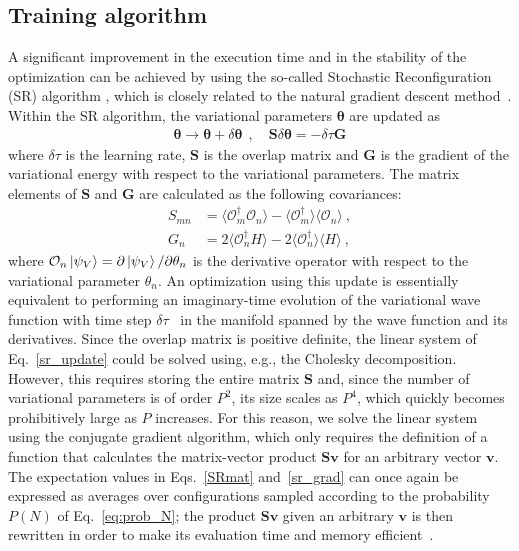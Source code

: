 \documentclass[aps,pre,floatfix,showpacs,twocolumn, preprintnumbers]{revtex4-1}
\begin{document}
\subsection{Training algorithm}\label{VMC:training}
A significant improvement in the execution time and in the stability of the optimization can be achieved by using the so-called Stochastic Reconfiguration (SR) algorithm \cite{Sorella:2005}, which is closely related to the natural gradient descent method~\cite{amari_natural_1998, Stokes:2019}. Within the SR algorithm, the variational parameters $\bm \theta$ are updated as
\begin{align}
\bm\theta\to\bm \theta+\delta \bm \theta \ \ ,\quad 
    \bm S\delta\bm \theta = -\delta\tau\bm G 
    \label{sr_update}
\end{align}
where $\delta\tau$ is the learning rate, $\bm S$ is the overlap matrix and $\bm G$ is the gradient of the variational energy with respect to the variational parameters. The matrix elements of $\bm S$ and $\bm G$ are calculated as the following covariances:
\begin{align}
    S_{mn} &= \langle \mathcal{O}_m^\dag\mathcal{O}_n\rangle - \langle \mathcal{O}_m^\dag\rangle\langle\mathcal{O}_n\rangle\ ,\label{SRmat}\\
    G_n &= 2\langle\mathcal{O}_n^\dag H\rangle - 2\langle \mathcal{O}_n^\dag\rangle\langle H\rangle\ ,\label{sr_grad}
\end{align}
where 
$\mathcal{O}_n\ket{\psi_V}=\partial\ket{\psi_V}/\partial\theta_n$ is the derivative operator with respect to the variational parameter $\theta_n$. An optimization using this update is essentially equivalent to performing an imaginary-time evolution of the variational wave function with time step $\delta\tau$~\cite{sorella_green_1998,Sorella:2005} in the manifold spanned by the wave function and its derivatives. Since the overlap matrix is positive definite, the linear system of Eq.~\eqref{sr_update} could be solved using, e.g., the Cholesky decomposition. However, this requires storing the entire matrix $\bm S$ and, since the number of variational parameters is of order $P^2$, its size scales as $P^4$, which quickly becomes prohibitively large as $P$ increases. For this reason, we solve the linear system using the conjugate gradient algorithm, which only requires the definition of a function that calculates the matrix-vector product $\bm S \bm v$ for an arbitrary vector $\bm v$. The expectation values in Eqs.~\eqref{SRmat} and~\eqref{sr_grad} can once again be expressed as averages over configurations sampled according to the probability $P(N)$ of Eq.~\eqref{eq:prob_N}; the product $\bm S \bm v$ given an arbitrary $\bm v$ is then rewritten in order to make its evaluation time and memory efficient~\cite{Neuscamman:2012}.
\end{document}
